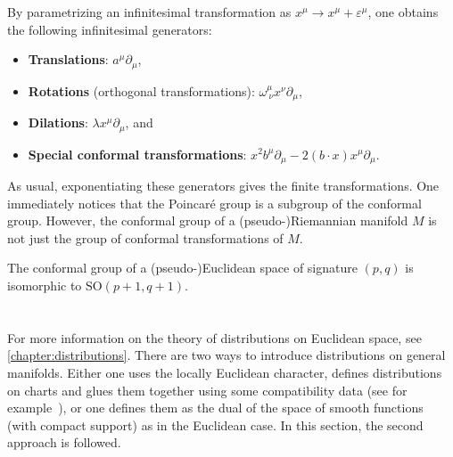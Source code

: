    By parametrizing an infinitesimal transformation as $x^\mu\rightarrow x^\mu+\varepsilon^\mu$, one obtains the following infinitesimal generators:
    \begin{itemize}
        \item\textbf{Translations}: $a^\mu\partial_\mu$,
        \item\textbf{Rotations} (orthogonal transformations): $\omega^\mu_{\ \nu}x^\nu\partial_\mu$,
        \item\textbf{Dilations}: $\lambda x^\mu\partial_\mu$, and
        \item\textbf{Special conformal transformations}: $x^2b^\mu\partial_\mu - 2(b\cdot x)x^\mu\partial_\mu$.
    \end{itemize}
    As usual, exponentiating these generators gives the finite transformations. One immediately notices that the Poincar\'e group is a subgroup of the conformal group. However, the conformal group of a (pseudo-)Riemannian manifold $M$ is not just the group of conformal transformations of $M$.
    \begin{property}\label{riemann:conformal_group}
        The conformal group of a (pseudo-)Euclidean space of signature $(p,q)$ is isomorphic to $\mathrm{SO}(p+1,q+1)$.
    \end{property}

\section{}

    For more information on the theory of distributions on Euclidean space, see \cref{chapter:distributions}. There are two ways to introduce distributions on general manifolds. Either one uses the locally Euclidean character, defines distributions on charts and glues them together using some compatibility data (see for example~\citet{choquet-bruhat_analysis_1991}), or one defines them as the dual of the space of smooth functions (with compact support) as in the Euclidean case. In this section, the second approach is followed.

